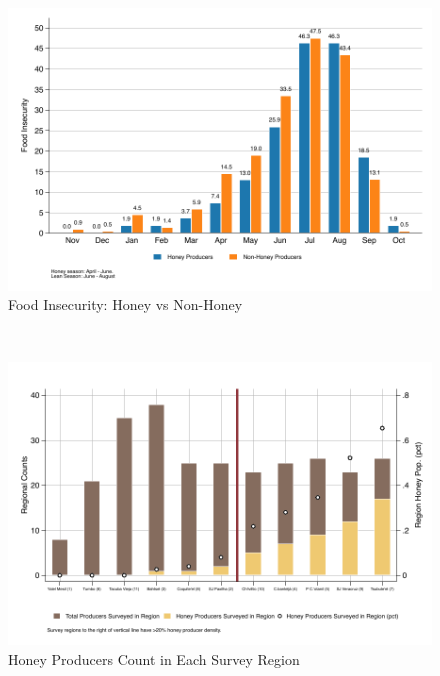 \documentclass[../main.tex]{subfiles}
\begin{document}
\begin{figure}[h!]
    \centering
    \caption{Food Insecurity: Honey vs Non-Honey}
    \label{fig:graph_food_insecurity_honey_nonhoney}    \includegraphics[width=1\textwidth]{project/figures/pdf/graph_food_insecurity_honey_nonhoney.pdf}
\end{figure}\\














\begin{figure}[h!]
    \centering
    \caption{Honey Producers Count in Each Survey Region}
    \label{fig:graph_honey_regional_counts}    \includegraphics[width=1\textwidth]{project/figures/pdf/graph_honey_regional_counts.pdf}

\end{figure}
\end{document}
